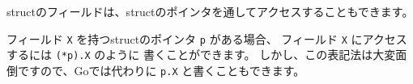 structのフィールドは、structのポインタを通してアクセスすることもできます。

フィールド \texttt{X} を持つstructのポインタ \texttt{p} がある場合、
フィールド \texttt{X} にアクセスするには \texttt{(*p).X} のように
書くことができます。 しかし、この表記法は大変面倒ですので、Goでは代わりに
\texttt{p.X} と書くこともできます。